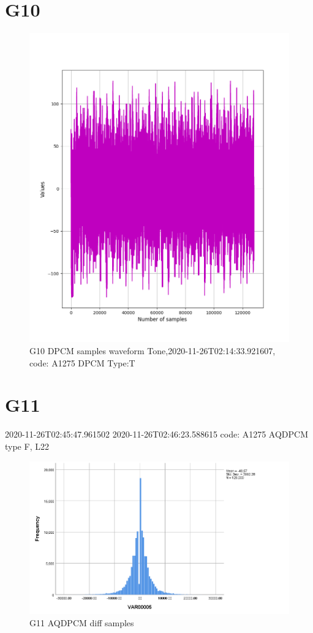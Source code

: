 \documentclass[hidelinks, 12pt, a4paper]{article}
\begin{document}
\section{G10}

\begin{figure}[h!]
\centering
	\includegraphics[height=.4\textheight, width=\textwidth]{assets/session1/g10.png}
    \caption{G10 DPCM samples waveform Tone,2020-11-26T02:14:33.921607, code: A1275 DPCM Type:T}
\end{figure}

\section{G11}
2020-11-26T02:45:47.961502
2020-11-26T02:46:23.588615
code: A1275 AQDPCM type F, L22
\begin{figure}[h!]
\centering
	\includegraphics[height=.4\textheight, width=\textwidth]{assets/session1/g11.png}
    \caption{G11 AQDPCM diff samples}
\end{figure}
\end{document}
